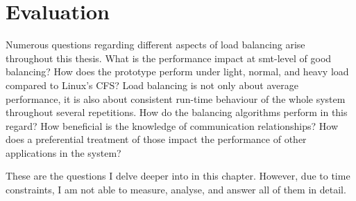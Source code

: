 \chapter{Evaluation}
\label{sec:evaluation}


Numerous questions regarding different aspects of load balancing arise
throughout this thesis.
What is the performance impact at \gls{smt}-level of good balancing?
How does the prototype perform under light, normal, and heavy load compared to
Linux's CFS?
Load balancing is not only about average performance, it is also about consistent
run-time behaviour of the whole system throughout several repetitions. How do
the balancing algorithms perform in this regard?
How beneficial is the knowledge of communication relationships?
How does a preferential treatment of those impact the performance of other
applications in the system?

These are the questions I delve deeper into in this chapter.
However, due to time constraints, I am not able to measure, analyse, and answer
all of them in detail.





\begin{comment}

Is behaviour aware load balancing on L4Re better than behaviour unaware
balancing?
What differences are observable between different SMT assignment schemes?

When compared with Linux \gls{cfs} scheduler, how different is the
performance?

Of interest are performance degradation compared to solo execution, when
executed in parallel with other applications.
Also, the related work suggests that the execution time is much more
deterministic, hence the maximum and minimum execution times are close
together.


\end{comment}


\cleardoublepage

